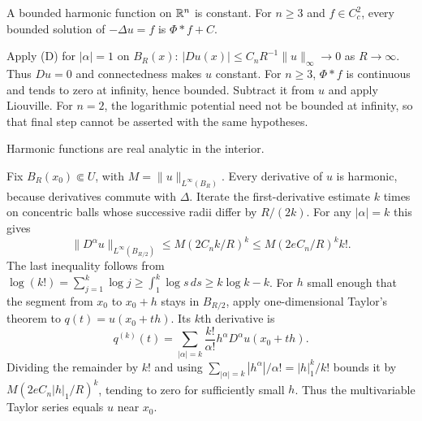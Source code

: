 \begin{theorem}
A bounded harmonic function on $\mathbb{R}^n$ is constant.
For $n\geq3$ and $f\in C_c^2$, every bounded solution of
$-\Delta u=f$ is $\Phi*f+C$.
\end{theorem}
\begin{expandedproof}
Apply (D) for $|\alpha|=1$ on $B_R(x)$:
$|Du(x)|\leq C_nR^{-1}\|u\|_\infty\to0$ as $R\to\infty$.
Thus $Du=0$ and connectedness makes $u$ constant.
For $n\geq3$, $\Phi*f$ is continuous and tends to zero at infinity,
hence bounded. Subtract it from $u$ and apply Liouville.
For $n=2$, the logarithmic potential need not be bounded at infinity,
so that final step cannot be asserted with the same hypotheses.
\end{expandedproof}

\begin{theorem}
Harmonic functions are real analytic in the interior.
\end{theorem}
\begin{expandedproof}
Fix $B_R(x_0)\Subset U$, with $M=\|u\|_{L^\infty(B_R)}$.
Every derivative of $u$ is harmonic, because derivatives commute with
$\Delta$. Iterate the first-derivative estimate $k$ times on concentric
balls whose successive radii differ by $R/(2k)$.
For any $|\alpha|=k$ this gives
\[
 \|D^\alpha u\|_{L^\infty(B_{R/2})}
 \leq M(2C_n k/R)^k
 \leq M(2eC_n/R)^k k!.
\]
The last inequality follows from
$\log(k!)=\sum_{j=1}^k\log j\geq\int_1^k\log s\,ds
\geq k\log k-k$.
For $h$ small enough that the segment from $x_0$ to $x_0+h$ stays in
$B_{R/2}$, apply one-dimensional Taylor's theorem to
$q(t)=u(x_0+th)$. Its $k$th derivative is
\[
 q^{(k)}(t)=\sum_{|\alpha|=k}\frac{k!}{\alpha!}
                    h^\alpha D^\alpha u(x_0+th).
\]
Dividing the remainder by $k!$ and using
$\sum_{|\alpha|=k}|h^\alpha|/\alpha!=|h|_1^k/k!$ bounds it by
$M(2eC_n|h|_1/R)^k$, tending to zero for sufficiently small $h$.
Thus the multivariable Taylor series equals $u$ near $x_0$.
\end{expandedproof}
\Needspace{45mm}

